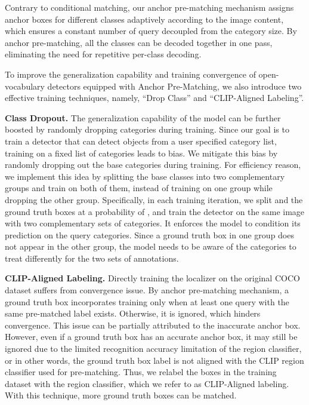 \documentclass[10pt,twocolumn,letterpaper]{article}
\begin{document}
Contrary to conditional matching, our anchor pre-matching mechanism assigns anchor boxes for different classes adaptively according to the image content, which ensures a constant number of query decoupled from the category size. 
By anchor pre-matching, all the classes can be decoded together in one pass, eliminating the need for repetitive per-class decoding.

To improve the generalization capability and training convergence of open-vocabulary detectors equipped with Anchor Pre-Matching, we also introduce two effective training techniques, namely, ``Drop Class'' and ``CLIP-Aligned Labeling''.

\noindent\textbf{Class Dropout.} The generalization capability of the model can be further boosted by randomly dropping categories during training.
Since our goal is to train a detector that can detect objects from a user specified category list, training on a fixed list of categories leads to bias. 
We mitigate this bias by randomly dropping out the base categories during training.
For efficiency reason, we implement this idea by splitting the base classes into two complementary groups and train on both of them, instead of training on one group while dropping the other group.
Specifically, in each training iteration, we split  and the ground truth boxes at a probability of , and train the detector on the same image with two complementary sets of categories. 
It enforces the model to condition its prediction on the query categories.
Since a ground truth box in one group does not appear in the other group,
the model needs to be aware of the categories to treat differently for the two sets of annotations.

\noindent\textbf{CLIP-Aligned Labeling.} Directly training the localizer on the original COCO dataset suffers from convergence issue.
By anchor pre-matching mechanism, a ground truth box incorporates training only when at least one query with the same pre-matched label exists.
Otherwise, it is ignored, which hinders convergence. 
This issue can be partially attributed to the inaccurate anchor box.
However, even if a ground truth box has an accurate anchor box, it may still be ignored due to the limited recognition accuracy limitation of the region classifier, or in other words, the ground truth box label is not aligned with the CLIP region classifier used for pre-matching.
Thus, we relabel the boxes in the training dataset with the region classifier, which we refer to as CLIP-Aligned labeling. With this technique, more ground truth boxes can be matched.
\end{document}
